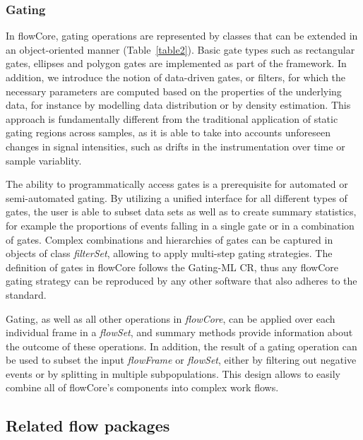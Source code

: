\documentclass[12pt]{article}
\newcommand{\Rpackage}[1]{{\textsf{#1}}}
\newcommand{\Rclass}[1]{{\textit{#1}}}
\begin{document}
\subsubsection*{Gating}
In \Rpackage{flowCore}, gating operations are represented by classes
that can be extended in an object-oriented manner
(Table~\ref{table2}). Basic gate types such as rectangular gates,
ellipses and polygon gates are implemented as part of the
framework. In addition, we introduce the notion of data-driven gates,
or filters, for which the necessary parameters are computed based on
the properties of the underlying data, for instance by modelling data
distribution or by density estimation. This approach is fundamentally
different from the traditional application of static gating regions
across samples, as it is able to take into accounts unforeseen changes
in signal intensities, such as drifts in the instrumentation
over time or sample variablity.

The ability to programmatically access gates is a prerequisite for
automated or semi-automated gating. By utilizing a unified interface
for all different types of gates, the user is able to subset data sets
as well as to create summary statistics, for example the proportions
of events falling in a single gate or in a combination of
gates. Complex combinations and hierarchies of gates can be captured
in objects of class \Rclass{filterSet}, allowing to apply multi-step
gating strategies. The definition of gates in \Rpackage{flowCore}
follows the Gating-ML CR, thus any \Rpackage{flowCore} gating strategy
can be reproduced by any other software that also adheres to the
standard.

Gating, as well as all other operations in \Rclass{flowCore}, can be
applied over each individual frame in a \Rclass{flowSet}, and summary
methods provide information about the outcome of these operations. In
addition, the result of a gating operation can be used to subset the
input \Rclass{flowFrame} or \Rclass{flowSet}, either by filtering out
negative events or by splitting in multiple subpopulations. This
design allows to easily combine all of \Rpackage{flowCore}'s
components into complex work flows.


\subsection*{Related flow packages}
\end{document}
